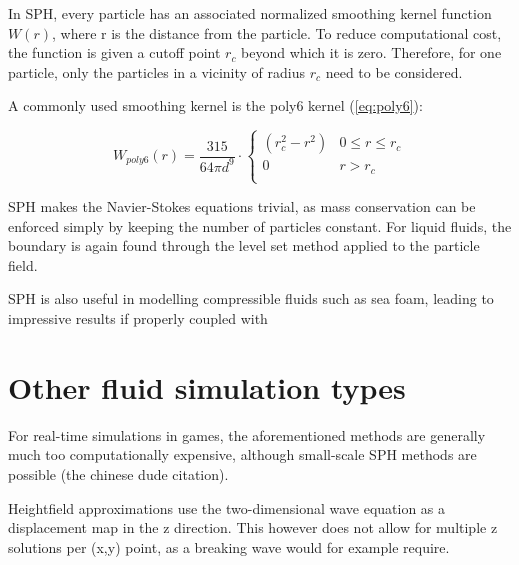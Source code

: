\documentclass[12pt]{article}
\begin{document}
In SPH, every particle has an associated normalized smoothing kernel function $W(r)$, where r is the distance from the particle. To reduce computational cost, the function is given a cutoff point $r_c$ beyond which it is zero. Therefore, for one particle, only the particles in a vicinity of radius $r_c$ need to be considered.

A commonly used smoothing kernel is the poly6 kernel (\ref{eq:poly6}):

\begin{equation}
W_{poly6}(r)=\frac{315}{64\pi d^9}\cdot\begin{cases}
(r_c^2-r^2) & 0\leq r\leq r_c\\
0 & r>r_c\\
\end{cases}
\label{eq:poly6}
\end{equation}

SPH makes the Navier-Stokes equations trivial, as mass conservation can be enforced simply by keeping the number of particles constant. For liquid fluids, the boundary is again found through the level set method applied to the particle field.


SPH is also useful in modelling compressible fluids such as sea foam, leading to impressive results if properly coupled with 



\section{Other fluid simulation types}

For real-time simulations in games, the aforementioned methods are generally much too computationally expensive, although small-scale SPH methods are possible (the chinese dude citation).

Heightfield approximations use the two-dimensional wave equation as a displacement map in the z direction. This however does not allow for multiple z solutions per (x,y) point, as a breaking wave would for example require.
\end{document}
